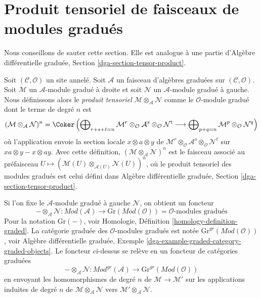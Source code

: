 \section{Produit tensoriel de faisceaux de modules gradués}
\label{section-tensor-product}

\noindent
Nous conseillons de sauter cette section. Elle est analogue à une partie
d'Algèbre différentielle graduée, Section \ref{dga-section-tensor-product}.

\medskip\noindent
Soit $(\mathcal{C}, \mathcal{O})$ un site annelé. Soit $\mathcal{A}$
un faisceau d'algèbres graduées sur $(\mathcal{C}, \mathcal{O})$.
Soit $\mathcal{M}$ un $\mathcal{A}$-module gradué à droite et soit
$\mathcal{N}$ un $\mathcal{A}$-module gradué à gauche. Nous définissons alors
le {\it produit tensoriel} $\mathcal{M} \otimes_\mathcal{A} \mathcal{N}$
comme le $\mathcal{O}$-module gradué dont le terme de degré $n$ est
$$
(\mathcal{M} \otimes_\mathcal{A} \mathcal{N})^n =
\Coker\left(
\bigoplus\nolimits_{r + s + t = n} \mathcal{M}^r \otimes_\mathcal{O}
\mathcal{A}^s \otimes_\mathcal{O} \mathcal{N}^t
\longrightarrow
\bigoplus\nolimits_{p + q = n} \mathcal{M}^p \otimes_\mathcal{O} \mathcal{N}^q
\right)
$$
où l'application envoie la section locale $x \otimes a \otimes y$ de
$\mathcal{M}^r \otimes_\mathcal{O} \mathcal{A}^s
\otimes_\mathcal{O} \mathcal{N}^t$ sur
$xa \otimes y - x \otimes ay$.
Avec cette définition, $(\mathcal{M} \otimes_\mathcal{A} \mathcal{N})^n$
est le faisceau associé au préfaisceau
$U \mapsto (\mathcal{M}(U) \otimes_{\mathcal{A}(U)} \mathcal{N}(U))^n$,
où le produit tensoriel des modules gradués est celui défini dans Algèbre
différentielle graduée, Section \ref{dga-section-tensor-product}.

\medskip\noindent
Si l'on fixe le $\mathcal{A}$-module gradué à gauche $\mathcal{N}$, on obtient
un foncteur
$$
- \otimes_\mathcal{A} \mathcal{N} :
\textit{Mod}(\mathcal{A})
\longrightarrow
\text{Gr}(\textit{Mod}(\mathcal{O})) =
\mathcal{O}\text{-modules}\text{ gradués}
$$
Pour la notation $\text{Gr}(-)$, voir Homologie, Définition
\ref{homology-definition-graded}. La catégorie graduée des
$\mathcal{O}$-modules gradués est notée
$\text{Gr}^{gr}(\textit{Mod}(\mathcal{O}))$, voir Algèbre différentielle
graduée, Exemple \ref{dga-example-graded-category-graded-objects}.
Le foncteur ci-dessus se relève en un foncteur de catégories graduées
$$
- \otimes_\mathcal{A} \mathcal{N} :
\textit{Mod}^{gr}(\mathcal{A})
\longrightarrow
\text{Gr}^{gr}(\textit{Mod}(\mathcal{O}))
$$
en envoyant les homomorphismes de degré $n$ de
$\mathcal{M} \to \mathcal{M}'$ sur les applications induites de degré $n$
de $\mathcal{M} \otimes_\mathcal{A} \mathcal{N}$ vers
$\mathcal{M}' \otimes_\mathcal{A} \mathcal{N}$.






